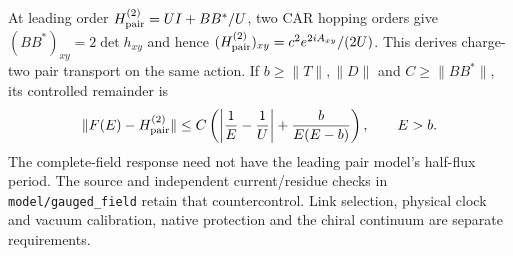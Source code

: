 At leading order $H_{\rm pair}^{(2)}=UI+BB^*/U$, two CAR hopping orders
give $(BB^*)_{xy}=2\det h_{xy}$ and hence
$(H_{\rm pair}^{(2)})_{xy}=c^2e^{2iA_{xy}}/(2U)$.
This derives charge-two pair transport on the same action. If
$b\ge\|T\|,\|D\|$ and $C\ge\|BB^*\|$, its controlled remainder is
\[
 \|F(E)-H_{\rm pair}^{(2)}\|
 \le C\left(\left|\frac1E-\frac1U\right|
              +\frac{b}{E(E-b)}\right),\qquad E>b.
\]
The complete-field response need not have the leading pair model's half-flux
period. The source and independent current/residue checks in
\texttt{model/gauged\_field} retain that countercontrol. Link selection,
physical clock and vacuum calibration, native protection and the chiral
continuum are separate requirements.
